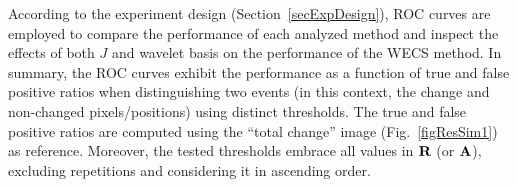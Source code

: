 \documentclass[journal]{IEEEtran}
\newcommand{\vA}{{\textbf A}}
\newcommand{\vR}{{\textbf R}}
\begin{document}
According to the experiment design (Section~\ref{secExpDesign}), ROC curves are employed to compare the performance of each analyzed method and inspect the effects of both $J$ and wavelet basis on the performance of the WECS method. In summary, the ROC curves exhibit the performance as a function of true and false positive ratios when distinguishing two events (in this context, the change and non-changed pixels/positions) using distinct thresholds. The true and false positive ratios are computed using the ``total change'' image (Fig.~\ref{figResSim1}) as reference. Moreover, the tested thresholds embrace all values in $\vR$ (or $\vA$), excluding repetitions and considering it in ascending order.



\end{document}
